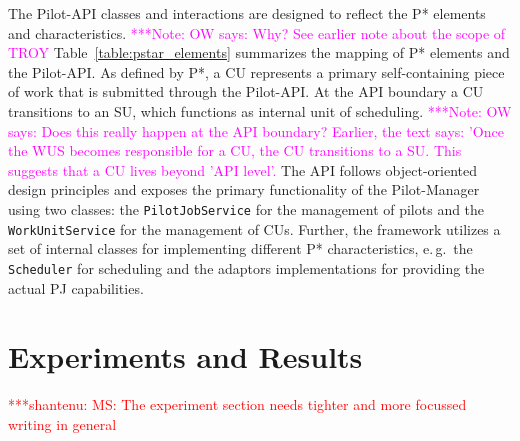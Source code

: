 \documentclass[conference,final]{IEEEtran}
\newcommand{\jhanote}[1]{ {\textcolor{red} { ***shantenu: #1 }}}
\newcommand{\note}[1]{ {\textcolor{magenta} { ***Note: #1 }}}
\newcommand{\jhanote}[1]{}
\newcommand{\note}[1]{}
\newcommand{\cu}{CU\xspace}
\newcommand{\cus}{CUs\xspace}
\newcommand{\upp}{\vspace*{-0.5em}}
\begin{document}
The Pilot-API classes and interactions are designed to reflect the P*
elements and characteristics.
\note{OW says: Why? See earlier note about the scope of TROY}
Table~\ref{table:pstar_elements}
summarizes the mapping of P* elements and the Pilot-API. As defined by P*, a \cu 
represents a primary self-containing piece of work that is submitted
through the Pilot-API. At the API boundary a \cu  transitions to an SU, which
functions as internal unit of scheduling.
\note{OW says: Does this really happen at the API boundary? Earlier, 
the text says: 'Once the WUS becomes responsible for a CU, the CU
transitions to a SU. This suggests that a CU lives beyond 'API level'.}
The API follows
object-oriented design principles and exposes the primary
functionality of the Pilot-Manager using two classes: the
\texttt{PilotJobService} for the management of pilots and the
\texttt{WorkUnitService} for the management of \cus. Further, the
framework utilizes a set of internal classes for implementing
different P* characteristics, e.\,g.\ the \texttt{Scheduler} for
scheduling and the adaptors implementations for providing the actual
PJ capabilities.




\section{Experiments and Results\upp\upp}
\label{sec:exp_res}

\jhanote{MS: The experiment section needs tighter and more focussed
  writing in general}
\end{document}
